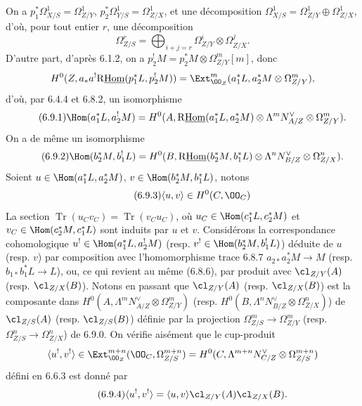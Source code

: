 On a $p_1^*\Omega^1_{X/S}=\Omega^1_{Z/Y}$, $p_2^*\Omega^1_{Y/S}=\Omega^1_{Z/X}$, et une décomposition $\Omega^1_{X/S}=\Omega^1_{Z/Y}\oplus\Omega^1_{Z/X}$, d'où, pour tout entier $r$, une décomposition
\begin{equation}
\tag{6.9.0}
\Omega^r_{Z/S}=\bigoplus_{i+j=r}\Omega^i_{Z/Y}\otimes\Omega^j_{Z/X}.
\end{equation}
D'autre part, d'après 6.1.2, on a $p_2^!M=p_2^*M\otimes\Omega^m_{Z/Y}[m]$, donc
\[
H^0(Z,a_*a^!\mathrm{R}\underline{\mathrm{Hom}}(p_1^*L,p_2^!M))=\Ext^m_{\OO_Z}(a_1^*L,a_2^*M\otimes\Omega^m_{Z/Y}),
\]
d'où, par 6.4.4 et 6.8.2, un isomorphisme
\begin{equation}
\tag{6.9.1}
\Hom(a_1^*L,a_2^!M)=H^0(A,\mathrm{R}\underline{\mathrm{Hom}}(a_1^*L,a_2^*M)\otimes\Lambda^m N_{A/Z}^{\vee}\otimes\Omega^m_{Z/Y}).
\end{equation}
On a de même un isomorphisme
\begin{equation}
\tag{6.9.2}
\Hom(b_2^*M,b_1^!L)=H^0(B,\mathrm{R}\underline{\mathrm{Hom}}(b_2^*M,b_1^*L)\otimes\Lambda^n N_{B/Z}^{\vee}\otimes\Omega^n_{Z/X}).
\end{equation}
Soient $u\in\Hom(a_1^*L,a_2^*M)$, $v\in\Hom(b_2^*M,b_1^*L)$, notons
\begin{equation}
\tag{6.9.3}
\langle u,v\rangle\in H^0(C,\OO_C)
\end{equation}
La
section $\operatorname{Tr}(u_Cv_C)=\operatorname{Tr}(v_Cu_C)$, où $u_C\in\Hom(c_1^*L,c_2^*M)$ et $v_C\in\Hom(c_2^*M,c_1^*L)$ sont induits par $u$ et $v$. Considérons la correspondance cohomologique $u^!\in\Hom(a_1^*L,a_2^!M)$ (resp. $v^!\in\Hom(b_2^*M,b_1^!L)$) déduite de $u$ (resp. $v$) par composition avec l'homomorphisme trace 6.8.7 $a_{2*}a_2^*M\to M$ (resp. $b_{1*}b_1^*L\to L$), ou, ce qui revient au même (6.8.6), par produit avec $\cl_{Z/Y}(A)$ (resp. $\cl_{Z/X}(B)$). Notons en passant que $\cl_{Z/Y}(A)$ (resp. $\cl_{Z/X}(B)$) est la composante dans $H^0(A,\Lambda^mN_{A/Z}^{\vee}\otimes\Omega^m_{Z/Y})$ (resp. $H^0(B,\Lambda^nN_{B/Z}^{\vee}\otimes\Omega^n_{Z/X})$) de $\cl_{Z/S}(A)$ (resp. $\cl_{Z/S}(B)$) définie par la projection $\Omega^m_{Z/S}\to\Omega^m_{Z/Y}$ (resp. $\Omega^n_{Z/S}\to\Omega^n_{Z/X}$) de 6.9.0. On vérifie aisément que le cup-produit
\[
\langle u^!,v^!\rangle\in\Ext^{m+n}_{\OO_Z}(\OO_C,\Omega^{m+n}_{Z/S})=H^0(C,\Lambda^{m+n}N_{C/Z}^{\vee}\otimes\Omega^{m+n}_{Z/S})
\]
défini en 6.6.3 est donné par
\begin{equation}
\tag{6.9.4}
\langle u^!,v^!\rangle=\langle u,v\rangle\cl_{Z/Y}(A)\cl_{Z/X}(B).
\end{equation}
